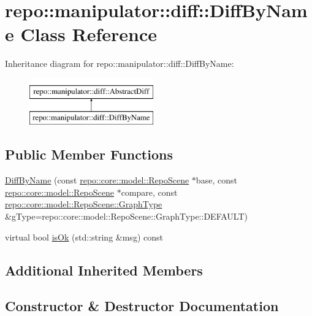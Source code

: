 \hypertarget{classrepo_1_1manipulator_1_1diff_1_1_diff_by_name}{}\section{repo\+:\+:manipulator\+:\+:diff\+:\+:Diff\+By\+Name Class Reference}
\label{classrepo_1_1manipulator_1_1diff_1_1_diff_by_name}
Inheritance diagram for repo\+:\+:manipulator\+:\+:diff\+:\+:Diff\+By\+Name\+:\begin{figure}[H]
\begin{center}
\leavevmode
\includegraphics[height=2.000000cm]{classrepo_1_1manipulator_1_1diff_1_1_diff_by_name}
\end{center}
\end{figure}
\subsection*{Public Member Functions}
\begin{DoxyCompactItemize}
\item 
\hyperlink{classrepo_1_1manipulator_1_1diff_1_1_diff_by_name_a50225fea6e71da2d5f17dd023246920b}{Diff\+By\+Name} (const \hyperlink{classrepo_1_1core_1_1model_1_1_repo_scene}{repo\+::core\+::model\+::\+Repo\+Scene} $\ast$base, const \hyperlink{classrepo_1_1core_1_1model_1_1_repo_scene}{repo\+::core\+::model\+::\+Repo\+Scene} $\ast$compare, const \hyperlink{classrepo_1_1core_1_1model_1_1_repo_scene_aefcacd6eb4c7774ac1bfe3a6b223337c}{repo\+::core\+::model\+::\+Repo\+Scene\+::\+Graph\+Type} \&g\+Type=repo\+::core\+::model\+::\+Repo\+Scene\+::\+Graph\+Type\+::\+D\+E\+F\+A\+U\+L\+T)
\item 
virtual bool \hyperlink{classrepo_1_1manipulator_1_1diff_1_1_diff_by_name_a4cb80e41c9543f130903d83d43d78f98}{is\+Ok} (std\+::string \&msg) const 
\end{DoxyCompactItemize}
\subsection*{Additional Inherited Members}


\subsection{Constructor \& Destructor Documentation}
\hypertarget{classrepo_1_1manipulator_1_1diff_1_1_diff_by_name_a50225fea6e71da2d5f17dd023246920b}{}
